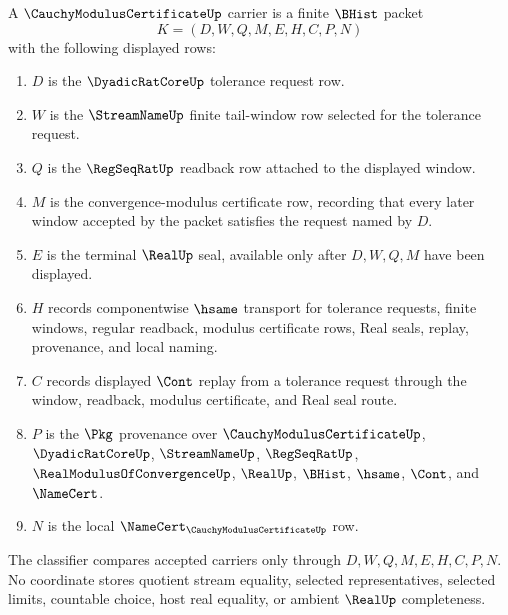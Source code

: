 \begin{definition}
\label{def:cauchy-modulus-certificate-carrier}
A $\CauchyModulusCertificateUp$ carrier is a finite $\BHist$ packet
$$
K=(D,W,Q,M,E,H,C,P,N)
$$
with the following displayed rows:
\begin{enumerate}
\item $D$ is the $\DyadicRatCoreUp$ tolerance request row.
\item $W$ is the $\StreamNameUp$ finite tail-window row selected for the tolerance request.
\item $Q$ is the $\RegSeqRatUp$ readback row attached to the displayed window.
\item $M$ is the convergence-modulus certificate row, recording that every later window accepted by the packet satisfies the request named by $D$.
\item $E$ is the terminal $\RealUp$ seal, available only after $D,W,Q,M$ have been displayed.
\item $H$ records componentwise $\hsame$ transport for tolerance requests, finite windows, regular readback, modulus certificate rows, Real seals, replay, provenance, and local naming.
\item $C$ records displayed $\Cont$ replay from a tolerance request through the window, readback, modulus certificate, and Real seal route.
\item $P$ is the $\Pkg$ provenance over $\CauchyModulusCertificateUp$, $\DyadicRatCoreUp$, $\StreamNameUp$, $\RegSeqRatUp$, $\RealModulusOfConvergenceUp$, $\RealUp$, $\BHist$, $\hsame$, $\Cont$, and $\NameCert$.
\item $N$ is the local $\NameCert_{\CauchyModulusCertificateUp}$ row.
\end{enumerate}
The classifier compares accepted carriers only through $D,W,Q,M,E,H,C,P,N$. No coordinate stores quotient stream equality, selected representatives, selected limits, countable choice, host real equality, or ambient $\RealUp$ completeness.
\end{definition}

